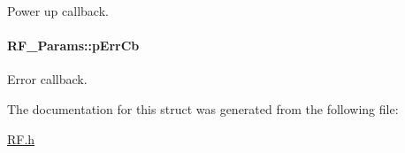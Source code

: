Power up callback. 

\paragraph[{p\+Err\+Cb}]{ R\+F\+\_\+\+Params\+::p\+Err\+Cb}\label{struct_r_f___params_ab7be231b23fab2503b8c54b474fba74d}


Error callback. 



The documentation for this struct was generated from the following file\+:\begin{DoxyCompactItemize}
\item 
\hyperlink{_r_f_8h}{R\+F.\+h}\end{DoxyCompactItemize}
